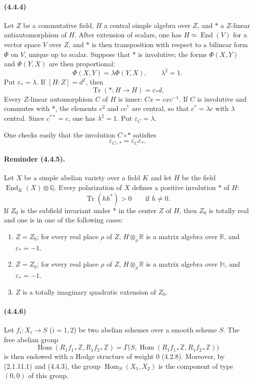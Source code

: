 \documentclass[10pt]{article}
\newcommand{\Q}{\mathbb Q}
\newcommand{\Z}{\mathbb Z}
\newcommand{\Hom}{\operatorname{Hom}}
\newcommand{\R}{\mathbb R}
\providecommand{\End}{\operatorname{End}}
\newcommand{\Tr}{\operatorname{Tr}}
\begin{document}
\paragraph{(4.4.4)} Let $Z$ be a commutative field, $H$ a central simple algebra over $Z$, and $*$ a $Z$-linear antiautomorphism of $H$. After extension of scalars, one has $H\simeq\End(V)$ for a vector space $V$ over $Z$, and $*$ is then transposition with respect to a bilinear form $\Phi$ on $V$, unique up to scalar. Suppose that $*$ is involutive; the forms $\Phi(X,Y)$ and $\Phi(Y,X)$ are then proportional:
\[
\Phi(X,Y)=\lambda\Phi(Y,X),\qquad \lambda^2=1.
\]
Put $\varepsilon_*=\lambda$. If $[H:Z]=d^2$, then
\[
\Tr(*:H\to H)=\varepsilon_*d.
\]
Every $Z$-linear automorphism $C$ of $H$ is inner: $Cx=cxc^{-1}$. If $C$ is involutive and commutes with $*$, the elements $c^2$ and $cc^*$ are central, so that $c^*=\lambda c$ with $\lambda$ central. Since $c^{**}=c$, one has $\lambda^2=1$. Put $\varepsilon_C=\lambda$.

One checks easily that the involution $C\circ *$ satisfies
\[
\varepsilon_{C\circ *}=\varepsilon_C\varepsilon_*.
\]

\paragraph{Reminder (4.4.5).} Let $X$ be a simple abelian variety over a field $K$ and let $H$ be the field $\End_K(X)\otimes\Q$. Every polarization of $X$ defines a positive involution $*$ of $H$:
\[
\Tr(hh^*)>0\qquad\text{if }h\ne0.
\]
If $Z_0$ is the subfield invariant under $*$ in the center $Z$ of $H$, then $Z_0$ is totally real and one is in one of the following cases:
\begin{enumerate}[label=\alph*)]
\item $Z=Z_0$; for every real place $\rho$ of $Z$, $H\otimes_\rho\R$ is a matrix algebra over $\R$, and $\varepsilon_*=-1$.
\item $Z=Z_0$; for every real place $\rho$ of $Z$, $H\otimes_\rho\R$ is a matrix algebra over $\mathbb H$, and $\varepsilon_*=-1$.
\item $Z$ is a totally imaginary quadratic extension of $Z_0$.
\end{enumerate}

\paragraph{(4.4.6)} Let $f_i:X_i\to S$ ($i=1,2$) be two abelian schemes over a smooth scheme $S$. The free abelian group
\[
\Hom(R_1f_{1*}\Z,R_1f_{2*}\Z)
=\Gamma\bigl(S,\Hom(R_1f_{1*}\Z,R_1f_{2*}\Z)\bigr)
\]
is then endowed with a Hodge structure of weight $0$ (4.2.8). Moreover, by (2.1.11.1) and (4.4.3), the group $\Hom_S(X_1,X_2)$ is the component of type $(0,0)$ of this group.
\end{document}
